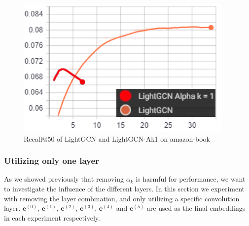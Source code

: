 \begin{figure}
    \includegraphics[width=\linewidth]{figures/alpha-k-results/amazon-recall.png}
    \caption{Recall@50 of LightGCN and LightGCN-Ak1 on amazon-book}
    \label{fig:recall-amazon-alpha-k}
\end{figure}

\subsubsection{Utilizing only one layer}
As we showed previously that removing $\alpha_k$ is harmful for performance, we want to investigate the influence of the different layers.
In this section we experiment with removing the layer combination, and only utilizing a specific convolution layer.
$\mathbf{e}^{(0)}$, $\mathbf{e}^{(1)}$, $\mathbf{e}^{(2)}$, $\mathbf{e}^{(3)}$, $\mathbf{e}^{(4)}$ and $\mathbf{e}^{(5)}$ are used as the final embeddings in each experiment respectively.

